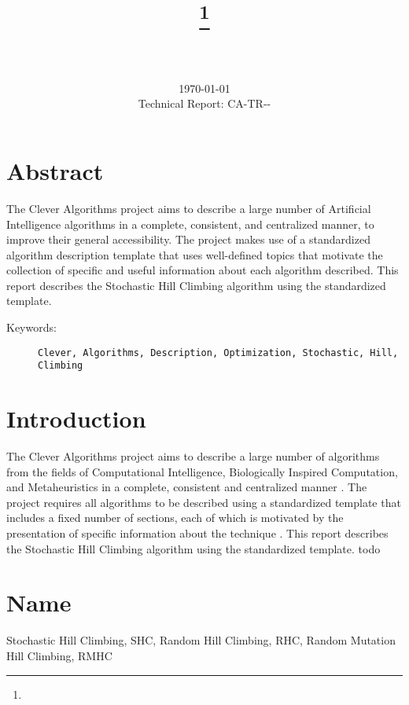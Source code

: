 \documentclass[a4paper, 11pt]{article}
\title{{\myreporttitle}\footnote{\myreportlicense}}
\author{\myreportauthor\\{\myreportemail}\\\small\myreportproject}
\date{\today\\{\small{Technical Report: CA-TR-{\myreportdate}-\myreportversion}}}
\begin{document}
\maketitle

\section*{Abstract} 
The Clever Algorithms project aims to describe a large number of Artificial Intelligence algorithms in a complete, consistent, and centralized manner, to improve their general accessibility. 
The project makes use of a standardized algorithm description template that uses well-defined topics that motivate the collection of specific and useful information about each algorithm described.
This report describes the Stochastic Hill Climbing algorithm using the standardized template.

\begin{description}
	\item[Keywords:] {\small\texttt{Clever, Algorithms, Description, Optimization, Stochastic, Hill, Climbing}}
\end{description} 

\section{Introduction} 
\label{sec:intro}
The Clever Algorithms project aims to describe a large number of algorithms from the fields of Computational Intelligence, Biologically Inspired Computation, and Metaheuristics in a complete, consistent and centralized manner \cite{Brownlee2010}.
The project requires all algorithms to be described using a standardized template that includes a fixed number of sections, each of which is motivated by the presentation of specific information about the technique \cite{Brownlee2010a}.
This report describes the Stochastic Hill Climbing algorithm using the standardized template.
todo

\section{Name} 
\label{sec:name}
Stochastic Hill Climbing, SHC, Random Hill Climbing, RHC, Random Mutation Hill Climbing, RMHC 
\end{document}
